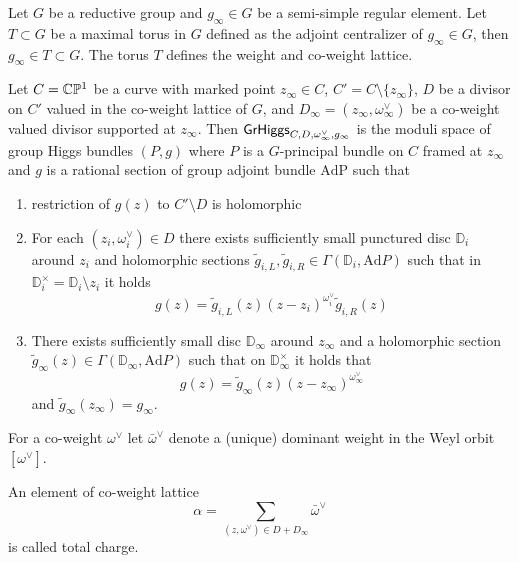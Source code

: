 \documentclass[12pt,psamsfonts,reqno]{amsart}
\begin{document}
\begin{definition}
  Let $G$ be a reductive group and $g_\infty \in G$ be a semi-simple
  regular element. Let $T \subset G$ be a maximal torus in $G$ defined as
 the adjoint centralizer of $g_\infty \in G$, then $g_\infty \in T \subset G$.
  The torus $T$ defines the weight and co-weight lattice.
  
Let $C = \mathbb C \mathbb P^1$ be a curve
  with marked point $z_\infty \in C$, $C' = C \setminus \{z_\infty\}$, $D$ be
  a divisor on $C'$ valued in the co-weight lattice of $G$, and $D_{\infty} = (z_\infty, 
\omega_{\infty}^{\vee})$ be a co-weight valued divisor supported at $z_\infty$. Then $\mathsf{GrHiggs}_{C, D, \omega^{\vee}_\infty, g_\infty}$ is the moduli space of
  group Higgs bundles $(P, g)$ where $P$ is a $G$-principal bundle on $C$ framed at $z_\infty$
  and $g$ is a rational section of group adjoint bundle $\mathrm{Ad P}$ such that 
    \begin{enumerate}
    \item restriction of $g(z)$ to $C' \setminus {D}$ is holomorphic 
    \item For each $(z_{i}, \omega_{i}^{\vee}) \in D$ there exists sufficiently small
      punctured disc $\mathbb{D}_{i}$ around $z_{i}$ and holomorphic
      sections $\tilde g_{i,L},\tilde g_{i,R} \in \Gamma(\mathbb{D}_i, \mathrm{Ad} P)$ such
      that in $\mathbb{D}^{\times}_{i} = \mathbb{D}_{i} \setminus {z_{i}}$ it holds
      \begin{equation}
        g(z) =  \tilde g_{i,L}(z) (z-z_{i})^{\omega_{i}^\vee} \tilde g_{i,R}(z)
      \end{equation}
    \item There exists sufficiently small disc $\mathbb{D}_{\infty}$ around $z_\infty$
      and a holomorphic section $\tilde g_{\infty}(z) \in \Gamma(\mathbb{D}_\infty, \mathrm{Ad} P)$ such that
      on $\mathbb{D}_\infty^{\times}$ it holds that 
      \begin{equation}
        g(z) = \tilde g_\infty(z) (z - z_\infty)^{\omega_\infty^{\vee}}
      \end{equation}
      and $\tilde g_\infty(z_\infty) = g_\infty$. 
    \end{enumerate}
\end{definition}

For a co-weight $\omega^{\vee}$ let $\bar \omega^{\vee}$ denote
a (unique) dominant weight in the Weyl orbit $[\omega^{\vee}]$.


An element of co-weight lattice 
  \begin{equation}
   \alpha  =  \sum_{(z,\omega^{\vee}) \in D + D_\infty} \bar \omega^{\vee}
 \end{equation}
is called total charge. 
 
\end{document}
